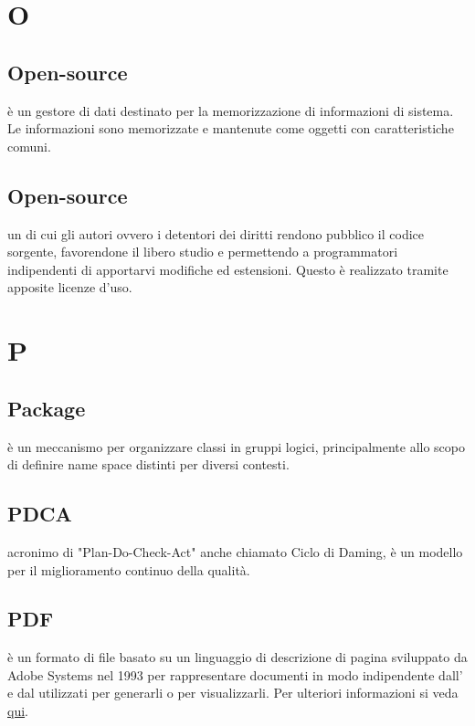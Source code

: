 \documentclass[12pt,a4paper]{article}
\begin{document}
\newpage

\section{O}



\subsection{Open-source} 
è un gestore di dati destinato per la memorizzazione di informazioni di sistema. Le informazioni sono memorizzate e mantenute come oggetti con caratteristiche comuni.

\subsection{Open-source} 
 un  di cui gli autori ovvero i detentori dei diritti rendono pubblico il codice sorgente, favorendone il libero studio e permettendo a programmatori indipendenti di apportarvi modifiche ed estensioni. Questo è realizzato tramite apposite licenze d'uso.


\newpage

\section{P}


\subsection{Package} 
è un meccanismo per organizzare classi  in gruppi logici, principalmente allo scopo di definire name space distinti per diversi contesti.

\subsection{PDCA} 
 acronimo di "Plan-Do-Check-Act" anche chiamato Ciclo di Daming, è un modello per il miglioramento continuo della qualità.

\subsection{PDF} 
 è un formato di file basato su un linguaggio di descrizione di pagina sviluppato da Adobe Systems nel 1993 per rappresentare documenti in modo indipendente dall’ e dal  utilizzati per generarli o per visualizzarli. Per ulteriori informazioni si veda \href{http://it.wikipedia.org/wiki/Portable_Document_Format}{qui}.
\end{document}
